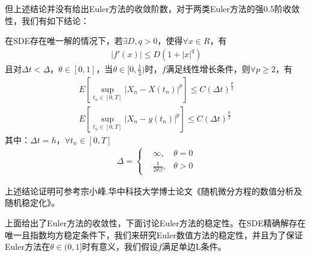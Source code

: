         \par
        但上述结论并没有给出Euler方法的收敛阶数，对于两类Euler方法的强0.5阶收敛性，我们有如下结论：
        \begin{theorem}[强0.5阶收敛性]
        在SDE存在唯一解的情况下，若$\exists D,q>0$，使得$\forall x\in R$，有
        \begin{align*}
        |f'(x)| \leqslant D(1+|x|^q)
        \end{align*}
        且对$\Delta t < \underline{\Delta}$，$\theta\in[0,1]$，当$\theta \in [0,\frac 12)$时，$f$满足线性增长条件，则$\forall p \geqslant 2$，有
        \begin{align*}
        E\left[\sup_{t_n \in[0,T]}|X_n - X(t_n)|^p \right] \leqslant C(\Delta t)^{\frac p2}\\
        E\left[\sup_{t_n \in[0,T]}|X_n - y(t_n)|^p \right] \leqslant C(\Delta t)^{\frac p2}
        \end{align*}
        其中：$\Delta t = h$，$\forall t_n\in [0,T]$
        \begin{align*}
            \underline{\Delta} =
            \left\{
                \begin{aligned}
                &\infty ,&\theta  = 0\\
                &\frac{1}{2\theta\beta },&\theta > 0
                \end{aligned}
            \right.
        \end{align*}
        \end{theorem}
        上述结论证明可参考\cite{zong.2014}宗小峰.华中科技大学博士论文《随机微分方程的数值分析及随机稳定化》。
        \par
        上面给出了Euler方法的收敛性，下面讨论Euler方法的稳定性。在SDE精确解存在唯一且指数均方稳定条件下，我们来研究Euler数值方法的稳定性，并且为了保证Euler方法在$\theta\in(0,1]$时有意义，我们假设$f$满足单边L条件。
